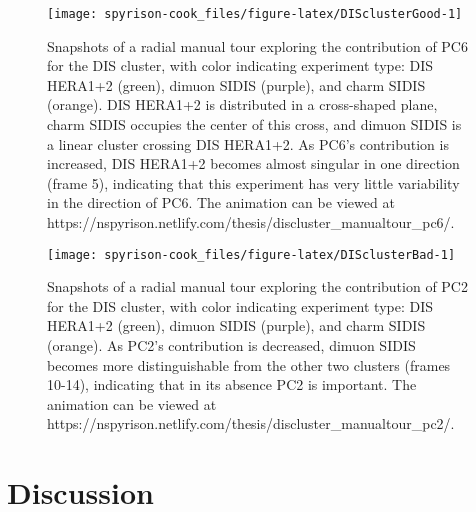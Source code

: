 \begin{Schunk}
\begin{figure}

{\centering \texttt{[image: spyrison-cook\_files/figure-latex/DISclusterGood-1]} 

}

\caption[Snapshots of a radial manual tour exploring the contribution of PC6 for the DIS cluster, with color indicating experiment type]{Snapshots of a radial manual tour exploring the contribution of PC6 for the DIS cluster, with color indicating experiment type: DIS HERA1+2 (green), dimuon SIDIS (purple), and charm SIDIS (orange). DIS HERA1+2 is distributed in a cross-shaped plane, charm SIDIS occupies the center of this cross, and dimuon SIDIS is a linear cluster crossing DIS HERA1+2. As PC6's contribution is increased, DIS HERA1+2 becomes almost singular in one direction (frame 5), indicating that this experiment has very little variability in the direction of PC6.  The animation can be viewed at https://nspyrison.netlify.com/thesis/discluster\_manualtour\_pc6/.}\label{fig:DISclusterGood}
\end{figure}
\end{Schunk}

\begin{Schunk}
\begin{figure}

{\centering \texttt{[image: spyrison-cook\_files/figure-latex/DISclusterBad-1]} 

}

\caption[Snapshots of a radial manual tour exploring the contribution of PC2 for the DIS cluster, with color indicating experiment type]{Snapshots of a radial manual tour exploring the contribution of PC2 for the DIS cluster, with color indicating experiment type: DIS HERA1+2 (green), dimuon SIDIS (purple), and charm SIDIS (orange). As PC2's contribution is decreased, dimuon SIDIS becomes more distinguishable from the other two clusters (frames 10-14), indicating that in its absence PC2 is important.  The animation can be viewed at https://nspyrison.netlify.com/thesis/discluster\_manualtour\_pc2/.}\label{fig:DISclusterBad}
\end{figure}
\end{Schunk}

\hypertarget{sec:discussion}{%
\section{Discussion}\label{sec:discussion}}

